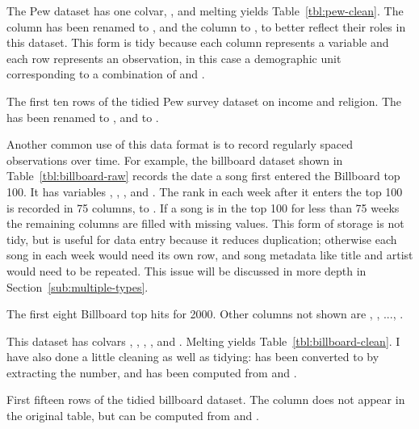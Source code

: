 \documentclass[article]{jss}
\begin{document}
The Pew dataset has one colvar, , and melting yields Table~\ref{tbl:pew-clean}. The  column has been renamed to , and the  column to , to better reflect their roles in this dataset. This form is tidy because each column represents a variable and each row represents an observation, in this case a demographic unit corresponding to a combination of  and .

\begin{table}[htbp]
  \centering
  
  \caption{The first ten rows of the tidied Pew survey dataset on income and religion. The   has been renamed to , and  to .}
  \label{tbl:pew-clean}
\end{table}

Another common use of this data format is to record regularly spaced observations over time. For example, the billboard dataset shown in Table~\ref{tbl:billboard-raw} records the date a song first entered the Billboard top 100. It has variables , , ,  and . The rank in each week after it enters the top 100 is recorded in 75 columns,  to . If a song is in the top 100 for less than 75 weeks the remaining columns are filled with missing values. This form of storage is not tidy, but is useful for data entry because it reduces duplication; otherwise each song in each week would need its own row, and song metadata like title and artist would need to be repeated. This issue will be discussed in more depth in Section~\ref{sub:multiple-types}.

\begin{table}[htbp]
  \centering
  
  \caption{The first eight Billboard top hits for 2000. Other columns not shown are , , ..., .}
  \label{tbl:billboard-raw}
\end{table}

This dataset has colvars , , , , and . Melting yields Table~\ref{tbl:billboard-clean}. I have also done a little cleaning as well as tidying:  has been converted to  by extracting the number, and  has been computed from  and .

\begin{table}[htbp]
  \centering
  
  \caption{First fifteen rows of the tidied billboard dataset. The  column does not appear in the original table, but can be computed from  and .}
  \label{tbl:billboard-clean}
\end{table}
\end{document}
